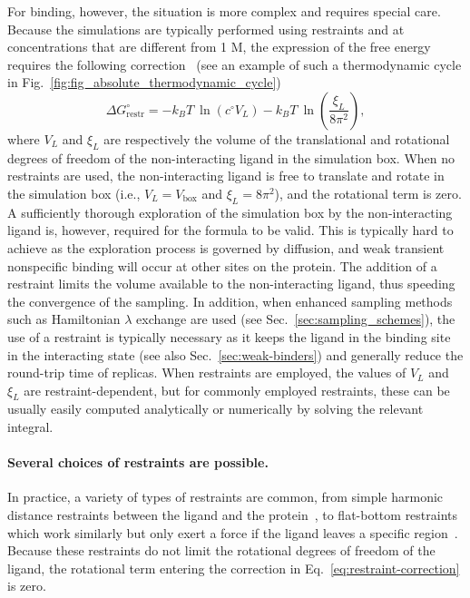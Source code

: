 \documentclass[9pt,bestpractices]{livecoms}
\begin{document}
For binding, however, the situation is more complex and requires special care.
Because the simulations are typically performed using restraints and at concentrations that are different from 1 M, the expression of the free energy requires the following correction~\cite{gilson1997statisticalthermodynamic} (see an example of such a thermodynamic cycle in Fig.~\ref{fig:fig_absolute_thermodynamic_cycle})
\begin{equation}\label{eq:restraint-correction}
    \Delta G^{\circ}_{\mathrm{restr}} = -k_BT ~ \ln \left( c^{\circ}{V_L} \right) -k_BT ~ \ln \left( \frac{\xi_L}{8 \pi^2} \right),
\end{equation}
where $V_L$ and $\xi_L$ are respectively the volume of the translational and rotational degrees of freedom of the non-interacting ligand in the simulation box.
When no restraints are used, the non-interacting ligand is free to translate and rotate in the simulation box (i.e., $V_L = V_{\mathrm{box}}$ and $\xi_L = 8\pi^2$), and the rotational term is zero.
A sufficiently thorough exploration of the simulation box by the non-interacting ligand is, however, required for the formula to be valid.
This is typically hard to achieve as the exploration process is governed by diffusion, and weak transient nonspecific binding will occur at other sites on the protein. 
The addition of a restraint limits the volume available to the non-interacting ligand, thus speeding the convergence of the sampling.
In addition, when enhanced sampling methods such as Hamiltonian $\lambda$ exchange are used (see Sec.~\ref{sec:sampling_schemes}), the use of a restraint is typically necessary as it keeps the ligand in the binding site in the interacting state (see also Sec.~\ref{sec:weak-binders}) and generally reduce the round-trip time of replicas.
When restraints are employed, the values of $V_L$ and $\xi_L$ are restraint-dependent, but for commonly employed restraints, these can be usually easily computed analytically or numerically by solving the relevant integral.

\paragraph{Several choices of restraints are possible.}\label{ABFErest}
In practice, a variety of types of restraints are common, from simple harmonic distance restraints between the ligand and the protein~\cite{mobley2006use}, to flat-bottom restraints which work similarly but only exert a force if the ligand leaves a specific region~\cite{chen2007can}.
Because these restraints do not limit the rotational degrees of freedom of the ligand, the rotational term entering the correction in Eq.~\ref{eq:restraint-correction} is zero.
\end{document}
